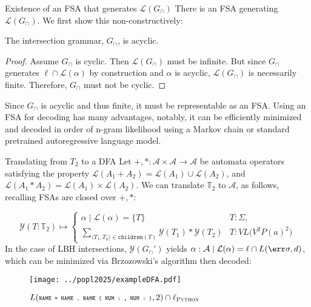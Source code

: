 \documentclass{beamer}
\begin{document}
\begin{frame}[fragile]{Existence of an FSA that generates $\mathcal{L}(G_\cap)$}
There is an FSA generating $\mathcal{L}(G_\cap)$. We first show this non-constructively:

\begin{lemma}\label{lemma:upper-bound}
The intersection grammar, $G_\cap$, is acyclic.
\end{lemma}

\begin{proof}
Assume $G_\cap$ is cyclic. Then $\mathcal{L}(G_\cap)$ must be infinite. But since $G_\cap$ generates $\ell \cap \mathcal{L}(\alpha)$ by construction and $\alpha$ is acyclic, $\mathcal{L}(G_\cap)$ is necessarily finite. Therefore, $G_\cap$ must not be cyclic.
\end{proof}

Since $G_\cap$ is acyclic and thus finite, it must be representable as an FSA. Using an FSA for decoding has many advantages, notably, it can be efficiently minimized and decoded in order of n-gram likelihood using a Markov chain or standard pretrained autoregressive language model.
\end{frame}

\begin{frame}[fragile]{Translating from $T_2$ to a DFA}
Let $+, *: \mathcal{A}\times \mathcal{A} \rightarrow \mathcal{A}$ be automata operators satisfying the property $\mathcal{L}(A_1 + A_2) = \mathcal{L}(A_1)\cup\mathcal{L}(A_2)$, and $\mathcal{L}(A_1 * A_2) = \mathcal{L}(A_1)\times\mathcal{L}(A_2)$. We can translate $\mathbb{T}_2$ to $\mathcal{A}$, as follows, recalling FSAs are closed over $+, *$:

\begin{equation*}
\mathcal{Y}(T:\mathbb{T}_2) \mapsto \begin{cases}
\alpha \mid \mathcal{L}(\alpha) = \{T\} & T: \Sigma, \\
\sum_{\langle T_1, T_2\rangle \in \texttt{children}(T)} \mathcal{Y}(T_1)*\mathcal{Y}(T_2) & T: VL\big(V^2P(a)^2\big)
\end{cases}
\end{equation*}
%
In the case of LBH intersections, $\mathcal{Y}(G_\cap')$ yields $\alpha: \mathcal{A} \mid \mathcal{L}(\alpha) = \ell\cap L(\err\sigma, d)$, which can be minimized via Brzozowski's algorithm then decoded:

\begin{figure}[H]
\centering
\texttt{[image: ../popl2025/exampleDFA.pdf]}
\caption{$L(\scriptsize{\texttt{NAME = NAME . NAME ( NUM : , NUM : )}}, 2) \cap \ell_\textsc{Python}$}
\end{figure}
\end{frame}
\end{document}

